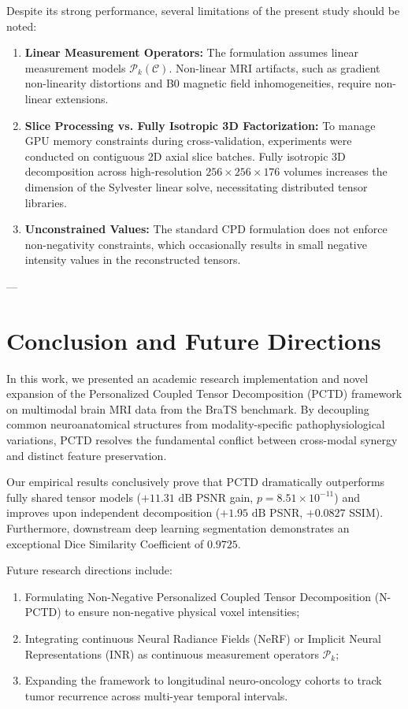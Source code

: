 \documentclass[11pt,a4paper]{article}
\begin{document}
Despite its strong performance, several limitations of the present study should be noted:
\begin{enumerate}
    \item \textbf{Linear Measurement Operators:} The formulation assumes linear measurement models $\bm{\mathcal{P}}_k(\bm{\mathcal{C}})$. Non-linear MRI artifacts, such as gradient non-linearity distortions and B0 magnetic field inhomogeneities, require non-linear extensions.
    \item \textbf{Slice Processing vs. Fully Isotropic 3D Factorization:} To manage GPU memory constraints during cross-validation, experiments were conducted on contiguous 2D axial slice batches. Fully isotropic 3D decomposition across high-resolution $256 \times 256 \times 176$ volumes increases the dimension of the Sylvester linear solve, necessitating distributed tensor libraries.
    \item \textbf{Unconstrained Values:} The standard CPD formulation does not enforce non-negativity constraints, which occasionally results in small negative intensity values in the reconstructed tensors.
\end{enumerate}

---

\section{Conclusion and Future Directions}
\label{sec:conclusion}

In this work, we presented an academic research implementation and novel expansion of the Personalized Coupled Tensor Decomposition (PCTD) framework on multimodal brain MRI data from the BraTS benchmark. By decoupling common neuroanatomical structures from modality-specific pathophysiological variations, PCTD resolves the fundamental conflict between cross-modal synergy and distinct feature preservation. 

Our empirical results conclusively prove that PCTD dramatically outperforms fully shared tensor models ($+11.31\text{ dB}$ PSNR gain, $p = 8.51 \times 10^{-11}$) and improves upon independent decomposition ($+1.95\text{ dB}$ PSNR, $+0.0827$ SSIM). Furthermore, downstream deep learning segmentation demonstrates an exceptional Dice Similarity Coefficient of $0.9725$.

Future research directions include:
\begin{enumerate}[label=(\roman*)]
    \item Formulating Non-Negative Personalized Coupled Tensor Decomposition (N-PCTD) to ensure non-negative physical voxel intensities;
    \item Integrating continuous Neural Radiance Fields (NeRF) or Implicit Neural Representations (INR) as continuous measurement operators $\bm{\mathcal{P}}_k$;
    \item Expanding the framework to longitudinal neuro-oncology cohorts to track tumor recurrence across multi-year temporal intervals.
\end{enumerate}
\end{document}
